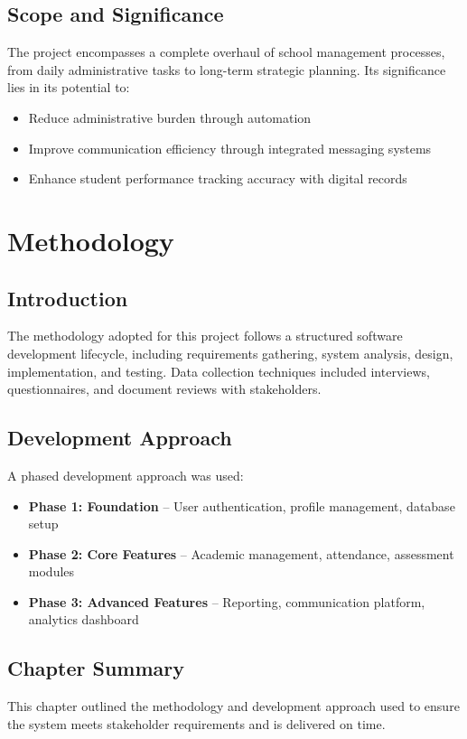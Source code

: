 \documentclass[12pt,a4paper]{report}
\begin{document}
\section{Scope and Significance}
The project encompasses a complete overhaul of school management processes, from daily administrative tasks to long-term strategic planning. Its significance lies in its potential to:
\begin{itemize}
    \item Reduce administrative burden through automation
    \item Improve communication efficiency through integrated messaging systems
    \item Enhance student performance tracking accuracy with digital records
\end{itemize}

\chapter{Methodology}
\section{Introduction}
The methodology adopted for this project follows a structured software development lifecycle, including requirements gathering, system analysis, design, implementation, and testing. Data collection techniques included interviews, questionnaires, and document reviews with stakeholders.

\section{Development Approach}
A phased development approach was used:
\begin{itemize}
    \item \textbf{Phase 1: Foundation} -- User authentication, profile management, database setup
    \item \textbf{Phase 2: Core Features} -- Academic management, attendance, assessment modules
    \item \textbf{Phase 3: Advanced Features} -- Reporting, communication platform, analytics dashboard
\end{itemize}

\section{Chapter Summary}
This chapter outlined the methodology and development approach used to ensure the system meets stakeholder requirements and is delivered on time.
\end{document}
